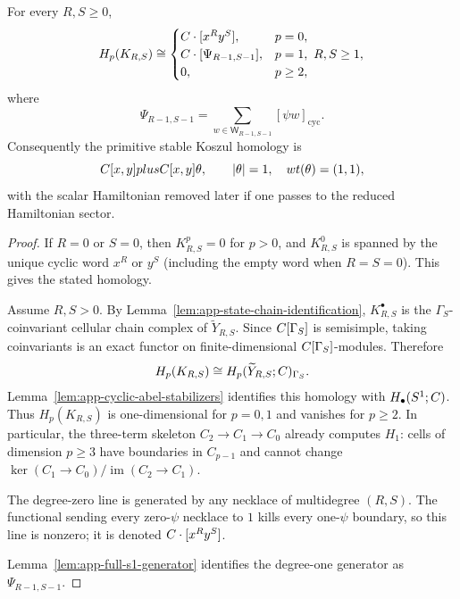 \begin{thm}
\label{thm:app-full-primitive-psi-homology}
  For every \(R,S\geq0\),
  \[
    H_p(K_{R,S})\cong
    \begin{cases}
      C\cdot[x^Ry^S],&p=0,\\
      C\cdot[\Psi_{R-1,S-1}],&p=1,\ R,S\geq1,\\
      0,&p\geq2,
    \end{cases}
  \]
  where
  \[
    \Psi_{R-1,S-1}
      =
      \sum_{w\in\mathsf W_{R-1,S-1}}[\psi w]_{\mathrm{cyc}} .
  \]
  Consequently the primitive stable Koszul homology is
  \[
    C[x,y]plusC[x,y]\theta,\qquad
    |\theta|=1,\quad wt(\theta)=(1,1),
  \]
  with the scalar Hamiltonian removed later if one passes to the reduced
  Hamiltonian sector.
\end{thm}

\begin{proof}
  If \(R=0\) or \(S=0\), then \(K^p_{R,S}=0\) for \(p>0\), and
  \(K^0_{R,S}\) is spanned by the unique cyclic word \(x^R\) or \(y^S\)
  (including the empty word when \(R=S=0\)).  This gives the stated homology.

  Assume \(R,S>0\).  By Lemma~\ref{lem:app-state-chain-identification},
  \(K^\bullet_{R,S}\) is the \(\Gamma_S\)-coinvariant cellular chain complex of
  \(\widetilde Y_{R,S}\).  Since \(C[\Gamma_S]\) is semisimple, taking
  coinvariants is an exact functor on finite-dimensional \(C[\Gamma_S]\)-modules.
  Therefore
  \[
    H_p(K_{R,S})
      \cong H_p(\widetilde Y_{R,S};C)_{\Gamma_S}.
  \]
  Lemma~\ref{lem:app-cyclic-abel-stabilizers} identifies this homology
  with \(H_\bullet(S^1;C)\).  Thus \(H_p(K_{R,S})\) is one-dimensional
  for \(p=0,1\) and vanishes for \(p\geq2\).
  In particular, the three-term skeleton
  \(C_2\to C_1\to C_0\) already computes \(H_1\): cells of dimension
  \(p\ge3\) have boundaries in \(C_{p-1}\) and cannot change
  \(\ker(C_1\to C_0)/\operatorname{im}(C_2\to C_1)\).

  The degree-zero line is generated by any necklace of multidegree \((R,S)\).
  The functional sending every zero-\(\psi\) necklace to \(1\) kills every
  one-\(\psi\) boundary, so this line is nonzero; it is denoted
  \(C\cdot[x^Ry^S]\).

  Lemma~\ref{lem:app-full-s1-generator} identifies the degree-one
  generator as \(\Psi_{R-1,S-1}\).
\end{proof}

